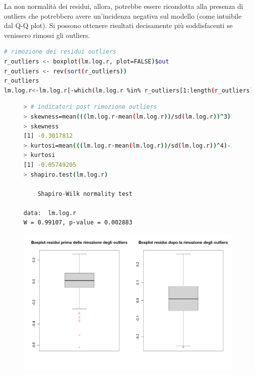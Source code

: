 \documentclass[11pt,a4paper]{article}
\begin{document}
La non normalità dei residui, allora, potrebbe essere ricondotta alla presenza di outliers che potrebbero avere un'incidenza negativa sul modello (come intuibile dal Q-Q plot).
Si possono ottenere risultati decisamente più soddisfacenti se venissero rimossi gli outliers.

\vspace{0.5cm}
\begin{lstlisting}[language=bash,basicstyle=\tiny,tabsize=2,frame = single]
# rimozione dei residui outliers
r_outliers <- boxplot(lm.log.r, plot=FALSE)$out
r_outliers <- rev(sort(r_outliers))
r_outliers
lm.log.r<-lm.log.r[-which(lm.log.r %in% r_outliers[1:length(r_outliers)])]

\end{lstlisting}

\begin{figure}[h]
    \vspace{-0.3cm}
    \hspace{-2.00cm}
    \begin{minipage}{.6\textwidth} 
    	\begin{lstlisting}[language=bash,basicstyle=\tiny,tabsize=2,frame = single]
> # indicatori post rimozione outliers
> skewness=mean(((lm.log.r-mean(lm.log.r))/sd(lm.log.r))^3)
> skewness
[1] -0.3017812
> kurtosi=mean(((lm.log.r-mean(lm.log.r))/sd(lm.log.r))^4)-3
> kurtosi
[1] -0.05749205
> shapiro.test(lm.log.r)

	Shapiro-Wilk normality test

data:  lm.log.r
W = 0.99107, p-value = 0.002883
    	\end{lstlisting}
    \end{minipage}
    \hspace{0.04\textwidth}%
    \begin{minipage}{0.5\textwidth} 
        \includegraphics[scale=0.35]{imgs/boxplots_residuals.png}
    \end{minipage}
\end{figure}
\vspace{-1.6cm}
\end{document}
